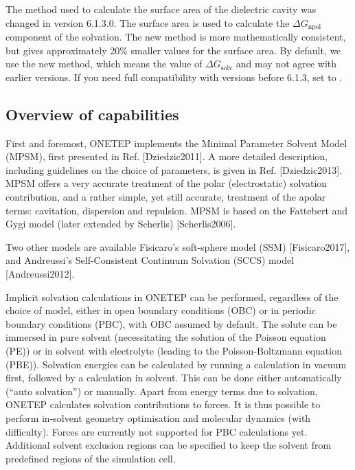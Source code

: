 \documentclass[letterpaper,10pt,english]{sphinxmanual}
\begin{document}
\begin{DUlineblock}{0em}
\item[] 
\item[] The method used to calculate the surface area of the dielectric cavity
was changed in version 6.1.3.0. The surface area is used to calculate
the \(\Delta G_{\textrm{npol}}\) component of the solvation. The
new method is more mathematically consistent, but gives approximately
20\% smaller values for the surface area. By default, we use the new
method, which means the value of \(\Delta G_{\textrm{solv}}\) and
may not agree with earlier versions. If you need full compatibility
with versions before 6.1.3, set  to
.
\end{DUlineblock}


\subsection{Overview of capabilities}
\label{\detokenize{implicit_solvation_v3:overview-of-capabilities}}
First and foremost, ONETEP implements the Minimal Parameter Solvent
Model (MPSM), first presented in Ref. {[}Dziedzic2011{]}. A more detailed description,
including guidelines on the choice of parameters, is given in Ref. {[}Dziedzic2013{]}.
MPSM offers a very accurate treatment of the polar (electrostatic)
solvation contribution, and a rather simple, yet still accurate,
treatment of the apolar terms: cavitation, dispersion and repulsion.
MPSM is based on the Fattebert and Gygi model (later extended by
Scherlis) {[}Scherlis2006{]}.

Two other models are available \textendash{} Fisicaro’s soft-sphere model (SSM)
{[}Fisicaro2017{]}, and Andreussi’s Self-Consistent Continuum
Solvation (SCCS) model {[}Andreussi2012{]}.

Implicit solvation calculations in ONETEP can be performed, regardless
of the choice of model, either in open boundary conditions (OBC) or in
periodic boundary conditions (PBC), with OBC assumed by default. The
solute can be immersed in pure solvent (necessitating the solution of
the Poisson equation (PE)) or in solvent with electrolyte (leading to
the Poisson-Boltzmann equation (PBE)). Solvation energies can be
calculated by running a calculation in vacuum first, followed by a
calculation in solvent. This can be done either automatically (“auto
solvation”) or manually. Apart from energy terms due to solvation,
ONETEP calculates solvation contributions to forces. It is thus possible
to perform in-solvent geometry optimisation and molecular dynamics (with
difficulty). Forces are currently not supported for PBC calculations
yet. Additional solvent exclusion regions can be specified to keep the
solvent from predefined regions of the simulation cell.
\end{document}
